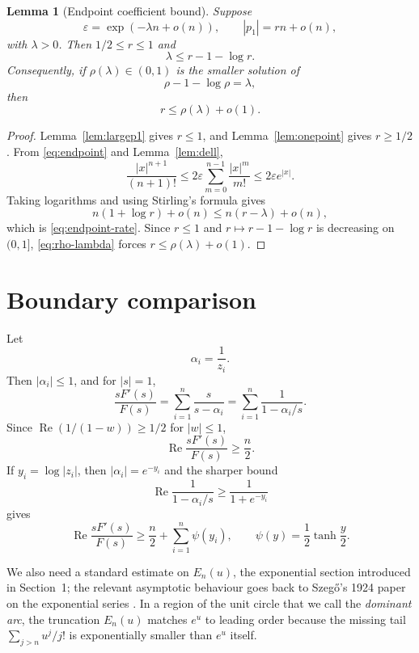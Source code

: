 \documentclass[11pt]{article}
\newtheorem{lemma}[theorem]{Lemma}
\newcommand{\eps}{\varepsilon}
\DeclareMathOperator{\Repart}{Re}
\begin{document}
\begin{lemma}[Endpoint coefficient bound]\label{lem:endpoint}
Suppose
\[
        \eps=\exp(-\lambda n+o(n)),
        \qquad |p_1|=rn+o(n),
\]
with $\lambda>0$.  Then $1/2\leq r\leq1$ and
\[
        \lambda\leq r-1-\log r.
        \tag{2.4}\label{eq:endpoint-rate}
\]
Consequently, if $\rho(\lambda)\in(0,1)$ is the smaller solution of
\[
        \rho-1-\log\rho=\lambda,
        \tag{2.5}\label{eq:rho-lambda}
\]
then
\[
        r\leq \rho(\lambda)+o(1).
\]
\end{lemma}

\begin{proof}
Lemma~\ref{lem:largep1} gives $r\leq1$, and
Lemma~\ref{lem:onepoint} gives $r\geq1/2$.  From \eqref{eq:endpoint} and
Lemma~\ref{lem:dell},
\[
        \frac{|x|^{n+1}}{(n+1)!}
        \leq 2\eps\sum_{m=0}^{n-1}\frac{|x|^m}{m!}
        \leq 2\eps e^{|x|}.
\]
Taking logarithms and using Stirling's formula gives
\[
        n(1+\log r)+o(n)\leq n(r-\lambda)+o(n),
\]
which is \eqref{eq:endpoint-rate}.  Since $r\le1$ and
$r\mapsto r-1-\log r$ is decreasing on $(0,1]$, \eqref{eq:rho-lambda}
forces $r\leq \rho(\lambda)+o(1)$.
\end{proof}

\section{Boundary comparison}

Let
\[
        \alpha_i=\frac1{z_i}.
\]
Then $|\alpha_i|\leq1$, and for $|s|=1$,
\[
        \frac{sF'(s)}{F(s)}=\sum_{i=1}^n\frac{s}{s-\alpha_i}
        =\sum_{i=1}^n\frac1{1-\alpha_i/s}.
\]
Since $\Repart(1/(1-w))\geq1/2$ for $|w|\leq1$,
\[
        \Repart\frac{sF'(s)}{F(s)}\geq \frac n2.
        \tag{3.1}\label{eq:schur-half}
\]
If $y_i=\log |z_i|$, then $|\alpha_i|=e^{-y_i}$ and the sharper bound
\[
        \Repart\frac1{1-\alpha_i/s}
        \geq \frac1{1+e^{-y_i}}
\]
gives
\[
        \Repart\frac{sF'(s)}{F(s)}
        \geq \frac n2+\sum_{i=1}^n \psi(y_i),
        \qquad
        \psi(y)=\frac12\tanh\frac y2 .
        \tag{3.2}\label{eq:weighted-schur}
\]

We also need a standard estimate on $E_n(u)$, the exponential section
introduced in Section~1; the relevant asymptotic behaviour goes back to
Szeg\H{o}'s 1924 paper on the exponential series \cite{Szego}.  In a region
of the unit circle that we call the \emph{dominant arc}, the truncation
$E_n(u)$ matches $e^u$ to leading order because the missing tail
$\sum_{j>n}u^j/j!$ is exponentially smaller than $e^u$ itself.
\end{document}
